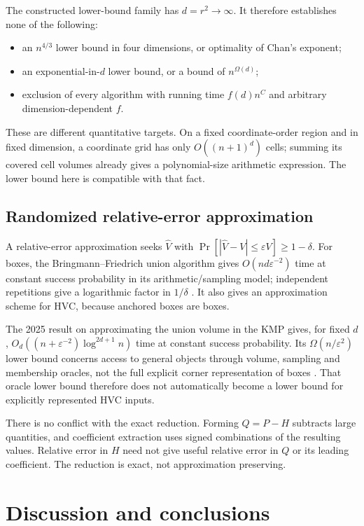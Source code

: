 \documentclass[12pt,a4paper]{article}
\theoremstyle{definition}
\theoremstyle{remark}
\begin{document}
The constructed lower-bound family has $d=r^2\to\infty$. It therefore
establishes none of the following:
\begin{itemize}
 \item an $n^{4/3}$ lower bound in four dimensions, or optimality of
 Chan's exponent;
 \item an exponential-in-$d$ lower bound, or a bound of $n^{\Omega(d)}$;
 \item exclusion of every algorithm with running time $f(d)n^C$ and
 arbitrary dimension-dependent $f$.
\end{itemize}
These are different quantitative targets. On a fixed coordinate-order
region and in fixed dimension, a coordinate grid has only $O((n+1)^d)$
cells; summing its covered cell volumes already gives a polynomial-size
arithmetic expression. The lower bound here is compatible with that
fact.

\subsection{Randomized relative-error approximation}

A relative-error approximation seeks $\widehat V$ with
$\Pr[|\widehat V-V|\le\varepsilon V]\ge1-\delta$.
For boxes, the Bringmann--Friedrich union algorithm gives
$O(nd\varepsilon^{-2})$ time at constant success probability in its
arithmetic/sampling model; independent repetitions give a logarithmic
factor in $1/\delta$ \cite{BringmannFriedrich}. It also gives an
approximation scheme for HVC, because anchored boxes are boxes.

The 2025 result on approximating the union volume in the KMP gives, for fixed $d$,
$O_d((n+\varepsilon^{-2})\log^{2d+1}n)$ time at constant success
probability. Its $\Omega(n/\varepsilon^2)$ lower bound concerns access
to general objects through volume, sampling and membership oracles,
not the full explicit corner representation of boxes
\cite{BringmannEtAl2025}. That oracle lower bound therefore does not
automatically become a lower bound for explicitly represented HVC inputs.

There is no conflict with the exact reduction. Forming $Q=P-H$ subtracts
large quantities, and coefficient extraction uses signed combinations
of the resulting values. Relative error in $H$ need not give useful
relative error in $Q$ or its leading coefficient. The reduction is exact,
not approximation preserving.

\section{Discussion and conclusions}
\label{sec:discussion}
\end{document}
